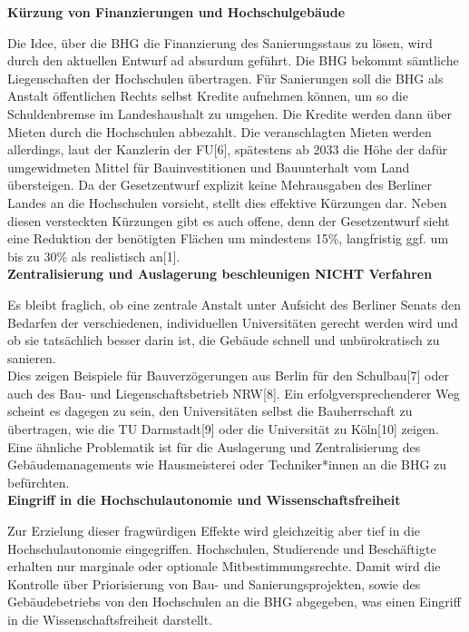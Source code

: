 \documentclass[DIV=calc]{scrartcl}
\let\oldgrqq=\grqq
\def\grqq{\oldgrqq\xspace}
\begin{document}
 \textbf{Kürzung von Finanzierungen und Hochschulgebäude}
 
 Die Idee, über die BHG die Finanzierung des Sanierungsstaus zu lösen, wird durch den aktuellen Entwurf ad absurdum geführt.
 Die BHG bekommt sämtliche Liegenschaften der Hochschulen übertragen. Für Sanierungen soll die BHG als Anstalt öffentlichen Rechts selbst Kredite aufnehmen können, um so die Schuldenbremse im Landeshaushalt zu umgehen. Die Kredite werden dann über Mieten durch die Hochschulen abbezahlt. Die veranschlagten Mieten werden allerdings,
 laut der Kanzlerin der FU[6], spätestens ab 2033 die Höhe der dafür umgewidmeten
 Mittel für Bauinvestitionen und Bauunterhalt vom Land übersteigen. Da der
 Gesetzentwurf explizit keine Mehrausgaben des Berliner Landes an die Hochschulen
 vorsieht, stellt dies effektive Kürzungen dar.
 Neben diesen versteckten Kürzungen gibt es auch offene, denn der Gesetzentwurf sieht
 eine \glqq Reduktion der benötigten Flächen um mindestens 15\%, langfristig ggf. um bis zu
 30\%\grqq{} als \glqq realistisch\grqq{} an[1].\\

\textbf{Zentralisierung und Auslagerung beschleunigen NICHT Verfahren}

 Es bleibt fraglich, ob eine zentrale Anstalt unter Aufsicht des Berliner Senats den Bedarfen der verschiedenen, individuellen Universitäten gerecht werden wird und ob
 sie tatsächlich besser darin ist, die Gebäude schnell und unbürokratisch zu sanieren.\\
 
 Dies zeigen Beispiele für Bauverzögerungen aus Berlin für den Schulbau[7] oder auch
 des Bau- und Liegenschaftsbetrieb NRW[8]. Ein erfolgversprechenderer Weg scheint es
 dagegen zu sein, den Universitäten selbst die Bauherrschaft zu übertragen, wie die TU Darmstadt[9] oder die Universität zu Köln[10] zeigen.\\
 
 Eine ähnliche Problematik ist für die Auslagerung und Zentralisierung des
 Gebäudemanagements wie Hausmeisterei oder Techniker*innen an die BHG zu befürchten.\\

 \textbf{Eingriff in die Hochschulautonomie und Wissenschaftsfreiheit}
 
 Zur Erzielung dieser fragwürdigen Effekte wird gleichzeitig aber tief in die
 Hochschulautonomie eingegriffen. Hochschulen, Studierende und Beschäftigte erhalten
 nur marginale oder optionale Mitbestimmungsrechte. Damit wird die Kontrolle über
 Priorisierung von Bau- und Sanierungsprojekten, sowie des Gebäudebetriebs von den
 Hochschulen an die BHG abgegeben, was einen Eingriff in die Wissenschaftsfreiheit
 darstellt.\\
 
\end{document}
